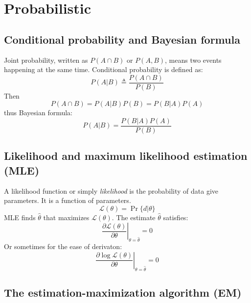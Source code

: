 \documentclass[10pt]{article}
\begin{document}
\section{Probabilistic}

\subsection{Conditional probability and Bayesian formula}

Joint probability, written as $P(A\cap B)$ or $P(A,B)$, means two events happening at the
same time.  Conditional probability is defined as:
$$
P(A|B)\triangleq\frac{P(A\cap B)}{P(B)}
$$
Then
$$
P(A\cap B)=P(A|B)P(B)=P(B|A)P(A)
$$
thus Bayesian formula:
$$
P(A|B)=\frac{P(B|A)P(A)}{P(B)}
$$

\begin{comment}
An example. Let
$$
X=\left\{\begin{array}{ll}
1 & \mbox{if sunny} \\
0 & \mbox{otherwise}
\end{array}\right.
$$
$$
Y=\left\{\begin{array}{ll}
1 & \mbox{if warm} \\
0 & \mbox{if cold}
\end{array}\right.
$$
$$
\Pr\{\mbox{sunny}\}=\Pr\{\mbox{sunny and warm}\}+\Pr\{\mbox{sunny and cold}\}
$$
$$
\Pr\{X=x\}=\sum_y\Pr\{X=x,Y=y\}
$$
\end{comment}

\subsection{Likelihood and maximum likelihood estimation (MLE)}

A likelihood function or simply \emph{likelihood} is the probability of data
give parameters. It is a function of parameters.
$$
\mathcal{L}(\theta)=\Pr\{d|\theta\}
$$
MLE finds $\hat{\theta}$ that maximizes $\mathcal{L}(\theta)$.  The estimate
$\hat{\theta}$ satisfies:
$$
\left.\frac{\partial \mathcal{L}(\theta)}{\partial\theta}\right|_{\theta=\hat{\theta}}=0
$$
Or sometimes for the ease of derivaton:
$$
\left.\frac{\partial \log\mathcal{L}(\theta)}{\partial\theta}\right|_{\theta=\hat{\theta}}=0
$$

\begin{comment}
An example. Suppose in the last August, 20 out of 31 days were sunny.
\end{comment}

\subsection{The estimation-maximization algorithm (EM)}
\end{document}
